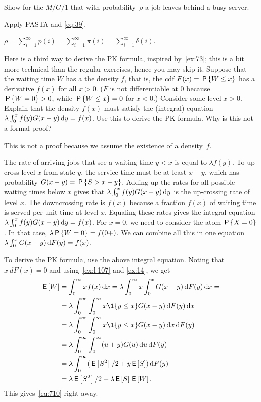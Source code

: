 \begin{exercise}\label{ex:28}
Show for the $M/G/1$  that  with probability~$\rho$ a job leaves behind a busy server.
\begin{hint}
 Apply PASTA and \cref{eq:39}.
\end{hint}
\begin{solution}
$\rho = \sum_{i=1}^\infty p(i) = \sum_{i=1}^\infty \pi(i) = \sum_{i=1}^\infty \delta(i)$.
\end{solution}
\end{exercise}

\begin{exercise}
Here is a third way to derive the PK formula, inspired by~\cref{ex:73}; this is a bit more technical than the regular exercises, hence you may skip it.
Suppose that the waiting time $W$ has a the density $f$, that is, the cdf $F(x) = \P{W\leq x}$ has a derivative $f(x)$ for all $x>0$. ($F$ is not differentiable at $0$ because $\P{W=0}>0$, while $\P{W\leq x} = 0$ for $x<0$.) Consider some level $x>0$. Explain that the density $f(x)$ must satisfy the (integral) equation $ \lambda \int_0^{x} f(y) G(x-y)\d y =  f(x)$. Use this to derive  the PK formula. Why is this not a formal proof?
\begin{solution}
This is not a proof because we assume the existence of a density~$f$.

The rate of arriving jobs that  see a waiting time $y<x$ is equal to $\lambda f(y)$.  To up-cross level $x$ from state $y$, the service time must be at least $x-y$, which has probability $G(x-y) = \P{S>x-y}$.  Adding up the  rates for all  possible waiting times below $x$ gives that $\lambda\int_0^x f(y) G(x-y)\d y$ is the up-crossing rate of level $x$. The downcrossing rate is $f(x)$ because a fraction $f(x)$ of waiting time is served per unit time at level $x$. Equaling these rates gives the integral equation $\lambda \int_0^{x} f(y) G(x-y)\d y =  f(x)$. For $x=0$, we need to consider the atom $\P{X=0}$. In that case, $\lambda \P{W=0} = f(0+)$. We can combine all this in one equation $\lambda\int_0^x G(x-y) \d F(y) = f(x)$.

To derive the PK formula, use the  above integral equation. Noting that $x\ d F(x) = 0$ and using~\cref{ex:l-107} and \cref{ex:14}, we get
\begin{align*}
  \E W
  &=    \int_0^{\infty} x f(x) \d x
  = \lambda \int_0^{\infty} x \int_0^{x} G(x-y) \d F(y) \d x= \\
  &= \lambda \int_0^{\infty} \int_0^{\infty} x \1{y \leq x} G(x-y) \d F(y)\d x  \\
  &= \lambda \int_0^{\infty} \int_0^{\infty} x \1{y \leq x} G(x-y) \d x \d F(y) \\
  &= \lambda \int_0^{\infty} \int_0^{\infty} (u+y) G(u) \d u \d F(y) \\
  &= \lambda \int_0^{\infty} (\E{S^2}/2 + y \E S) \d F(y) \\
  &= \lambda \E{S^2}/2 + \lambda \E S \E W.
\end{align*}
This gives~\cref{eq:710} right away.
\end{solution}
\end{exercise}




